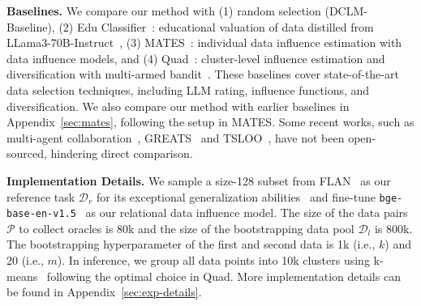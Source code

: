 

\textbf{Baselines.} We compare our method with (1) random selection (DCLM-Baseline), (2) Edu Classifier~\cite{penedo2024fineweb}: educational valuation of data distilled from LLama3-70B-Instruct~\cite{dubey2024llama}, (3) MATES~\cite{yu2024mates}: individual data influence estimation with data influence models, and (4) Quad~\cite{zhang2024quad}: cluster-level influence estimation and diversification with multi-armed bandit~\cite{vermorel2005multi}. These baselines cover state-of-the-art data selection techniques, including LLM rating, influence functions, and diversification. 
We also compare our method with earlier baselines in Appendix~\ref{sec:mates}, following the setup in MATES.
Some recent works, such as multi-agent collaboration~\cite{bai2024multi}, GREATS~\cite{wang2024greats} and TSLOO~\cite{wang2024capturing}, have not been open-sourced, hindering direct comparison.

\textbf{Implementation Details.} We sample a size-128 subset from FLAN~\cite{wei2022flan} as our reference task $\mathcal{D}_r$ for its exceptional generalization abilities~\cite{flan-t5} and fine-tune \texttt{bge-base-en-v1.5}~\cite{xiao2024bge} as our relational data influence model. The size of the data pairs $\mathcal{P}$ to collect oracles is 80k and the size of the bootstrapping data pool $\mathcal{D}_l$ is 800k. The bootstrapping hyperparameter of the first and second data is 1k (i.e., $k$) and 20 (i.e., $m$). In inference, we group all data points into 10k clusters using k-means~\cite{lloyd1982least} following the optimal choice in Quad. More implementation details can be found in Appendix~\ref{sec:exp-details}.




